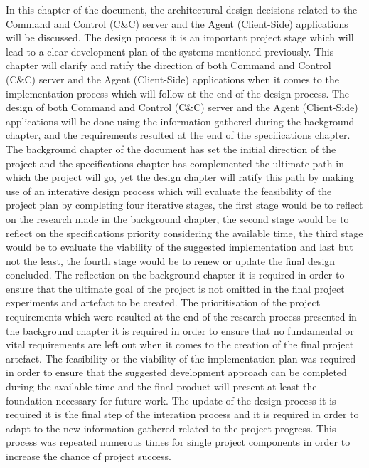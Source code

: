 In this chapter of the document, the architectural design decisions related to the Command and Control (C\&C)
server and the Agent (Client-Side) applications will be discussed. The design process
it is an important project stage which will lead to a clear development plan of the systems mentioned
previously. This chapter will clarify and ratify the direction of both Command and Control (C\&C)
server and the Agent (Client-Side) applications when it comes to the implementation process which
will follow at the end of the design process. The design of both Command and Control (C\&C)
server and the Agent (Client-Side) applications will be done using the information
gathered during the background chapter, and the requirements resulted at the end of the
specifications chapter. The background chapter of the document has set the initial
direction of the project and the specifications chapter has complemented the ultimate
path in which the project will go, yet the design chapter will ratify this path
by making use of an interative design process which will evaluate the feasibility
of the project plan by completing four iterative stages, the first stage would be
to reflect on the research made in the background chapter, the second stage would
be to reflect on the specifications priority considering the available time,
the third stage would be to evaluate the viability of the suggested implementation
and last but not the least, the fourth stage would be to renew or update the final
design concluded. The reflection on the background chapter it is required in order
to ensure that the ultimate goal of the project is not omitted in the final project
experiments and artefact to be created. The prioritisation of the project requirements
which were resulted at the end of the research process presented in the background chapter
it is required in order to ensure that no fundamental or vital requirements are
left out when it comes to the creation of the final project artefact. The feasibility or the viability
of the implementation plan was required in order to ensure that the suggested development approach can
be completed during the available time and the final product will present at least the foundation necessary
for future work. The update of the design process it is required it is the final step of the interation process
and it is required in order to adapt to the new information gathered related to the project progress.
This process was repeated numerous times for single project components
in order to increase the chance of project success.

